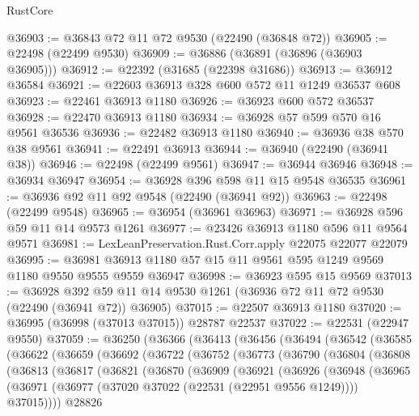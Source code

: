 \begin{lexlean}{RustCore}
\begin{coremodule}
@36903 := @36843 @72 @11 @72 @9530 (@22490 (@36848 @72))
@36905 := @22498 (@22499 @9530)
@36909 := @36886 (@36891 (@36896 (@36903 @36905)))
@36912 := @22392 (@31685 (@22398 @31686))
@36913 := @36912 @36584
@36921 := @22603 @36913 @328 @600 @572 @11 @1249 @36537 @608
@36923 := @22461 @36913 @1180
@36926 := @36923 @600 @572 @36537
@36928 := @22470 @36913 @1180
@36934 := @36928 @57 @599 @570 @16 @9561 @36536
@36936 := @22482 @36913 @1180
@36940 := @36936 @38 @570 @38 @9561
@36941 := @22491 @36913
@36944 := @36940 (@22490 (@36941 @38))
@36946 := @22498 (@22499 @9561)
@36947 := @36944 @36946
@36948 := @36934 @36947
@36954 := @36928 @396 @598 @11 @15 @9548 @36535
@36961 := @36936 @92 @11 @92 @9548 (@22490 (@36941 @92))
@36963 := @22498 (@22499 @9548)
@36965 := @36954 (@36961 @36963)
@36971 := @36928 @596 @59 @11 @14 @9573 @1261
@36977 := @23426 @36913 @1180 @596 @11 @9564 @9571
@36981 := LexLeanPreservation.Rust.Corr.apply @22075 @22077 @22079
@36995 := @36981 @36913 @1180 @57 @15 @11 @9561 @595 @1249 @9569 @1180 @9550 @9555 @9559 @36947
@36998 := @36923 @595 @15 @9569
@37013 := @36928
    @392
    @59
    @11
    @14
    @9530
    @1261
    (@36936 @72 @11 @72 @9530 (@22490 (@36941 @72)) @36905)
@37015 := @22507 @36913 @1180
@37020 := @36995 (@36998 (@37013 @37015)) @28787 @22537
@37022 := @22531 (@22947 @9550)
@37059 := @36250
    (@36366
      (@36413
        (@36456
          (@36494
            (@36542
              (@36585
                (@36622
                  (@36659
                    (@36692
                      (@36722
                        (@36752
                          (@36773
                            (@36790
                              (@36804
                                (@36808
                                  (@36813
                                    (@36817
                                      (@36821
                                        (@36870
                                          (@36909
                                            (@36921
                                              (@36926
                                                (@36948
                                                  (@36965
                                                    (@36971
                                                      (@36977
                                                        (@37020
                                                          @37022
                                                          (@22531 (@22951 @9556 @1249))))
                                                      @37015))))
                                              @28826

\end{coremodule}
\end{lexlean}
